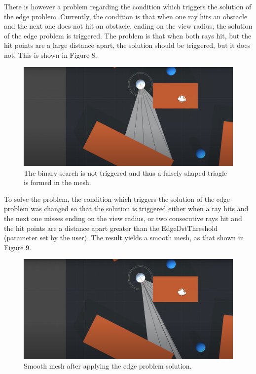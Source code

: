 \documentclass{article}
\begin{document}
There is however a problem regarding the condition which triggers the solution of the edge problem. Currently, the condition is that when one ray hits an obstacle and the next one does not hit an obstacle, ending on the view radius, the solution of the edge problem is triggered. The problem is that when both rays hit, but the hit points are a large distance apart, the solution should be triggered, but it does not. This is shown in Figure 8. 

\begin{figure} %
	\centering
	\includegraphics[width=1\columnwidth]{FOV(9).png} %
	\caption{The binary search is not triggered and thus a falsely shaped triagle is formed in the mesh.}
\end{figure}

To solve the problem, the condition which triggers the solution of the edge problem was changed so that the solution is triggered either when a ray hits and the next one misses ending on the view radius, or two consecutive rays hit and the hit points are a distance apart greater than the EdgeDstThreshold (parameter set by the user). The result yields a smooth mesh, as that shown in Figure 9.

\begin{figure} %
	\centering
	\includegraphics[width=1\columnwidth]{FOV(10).png} %
	\caption{Smooth mesh after applying the edge problem solution.}
\end{figure}
\end{document}
